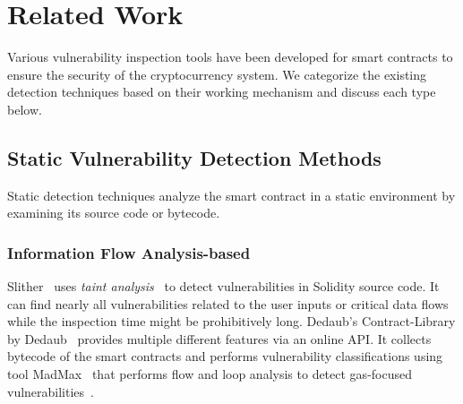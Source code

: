 \vspace{-0.3em}
\begin{table}[ht!]
\centering
{}
\vspace{1.8em}
\caption{Performance comparison of transfer learning between \sys{} and baseline (training-from-scratch). \label{tab:tl_comparison}}
\end{table}
\vspace{-2.3em}
\section{Related Work} 
\label{sec:related}
Various vulnerability inspection tools have been developed for smart contracts to ensure the security of the cryptocurrency system. We categorize the existing detection techniques based on their working mechanism and discuss each type below. 

\subsection{Static Vulnerability Detection Methods}
\label{sec:related:static}
Static detection techniques analyze the smart contract in a static environment by examining its source code or bytecode. 

\subsubsection{Information Flow Analysis-based}
{Slither}~\cite{feist2019slither} uses \textit{taint analysis}~\cite{tripp2009taj} to detect vulnerabilities in Solidity source code. 
It can find nearly all vulnerabilities related to the user inputs or critical data flows while the inspection time might be prohibitively long.
{Dedaub's Contract-Library} by Dedaub~\cite{rw_dedaub_contract_library_page} provides multiple different features via an online API. It collects bytecode of the smart contracts and performs vulnerability classifications using tool MadMax~\cite{rw_dedaub_mad_max_paper} that performs flow and loop analysis to detect gas-focused vulnerabilities~\cite{brent2020ethainter}. 

